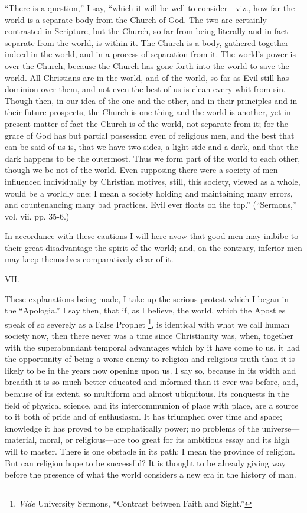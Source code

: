``There is a question,'' I say, ``which it will be well
to consider—viz., how far the world is a separate body from the
Church of God. The two are certainly contrasted in Scripture, but the
Church, so far from being literally and in fact separate from the
world, is within it. The Church is a body, gathered together indeed in
the world, and in a process of separation from it. The world's power
is over the Church, because the Church has gone forth into the world
to save the world. All Christians are in the world, and of the world,
so far as Evil still has dominion over them, and not even the best of
us is clean every whit from sin. Though then, in our idea of the one
and the other, and in their principles and in their future prospects,
the Church is one thing and the world is another, yet in present
matter of fact the Church is of the world, not separate from it; for
the grace of God has but partial possession even of religious men, and
the best that can be said of us is, that we have two sides, a light
side and a dark, and that the dark happens to be the outermost. Thus
we form part of the world to each other, though we be not of the
world. Even supposing there were a society of men influenced
individually by Christian motives, still, this society, viewed as a
whole, would be a worldly one; I mean a society holding and
maintaining many errors, and countenancing many bad practices. Evil
ever floats on the top.'' (``Sermons,'' vol. vii. pp.
35-6.)

In accordance with these cautions I will here avow that good men
may imbibe to their great disadvantage the spirit of the world; and,
on the contrary, inferior men may keep themselves comparatively clear
of it.

VII.

These explanations being made, I take up the serious protest which
I began in the ``Apologia.'' I say then, that if, as I
believe, the world, which the Apostles speak of so severely as a False
Prophet \footnote{\emph{Vide}
University Sermons, ``Contrast between Faith and Sight.''}, is identical
with what we call human society now, then there never was a time since
Christianity was, when, together with the superabundant temporal
advantages which by it have come to us, it had the opportunity of
being a worse enemy to religion and religious truth than it is likely
to be in the years now opening upon us. I say so, because in its width
and breadth it is so much better educated and informed than it ever
was before, and, because of its extent, so multiform and almost
ubiquitous. Its conquests in the field of physical science, and its
intercommunion of place with place, are a source to it both of pride
and of enthusiasm. It has triumphed over time and space; knowledge it
has proved to be emphatically power; no problems of the universe—material,
moral, or religious—are too great for its ambitious essay and its
high will to master. There is one obstacle in its path: I mean the
province of religion. But can religion hope to be successful? It is
thought to be already giving way before the presence of what the world
considers a new era in the history of man.

